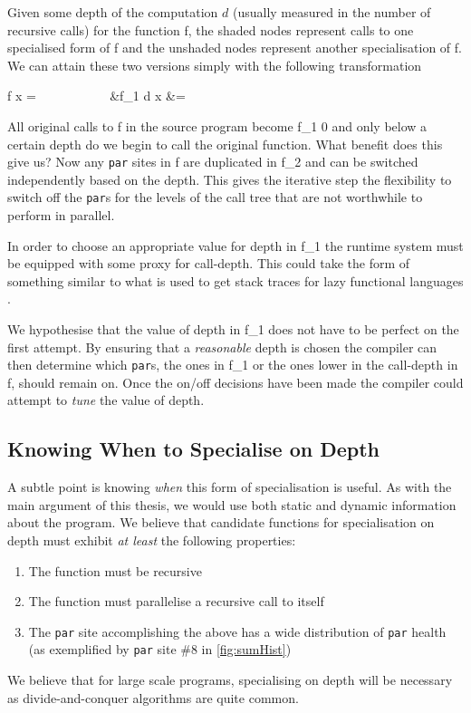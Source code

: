 Given some depth of the computation $d$ (usually measured in the number of
recursive calls) for the function \<f\>, the shaded nodes represent calls to one
specialised form of \<f\> and the unshaded nodes represent another specialisation
of \<f\>. We can attain these two versions simply with the following transformation

\begin{haskell}
f x =  \(\phantom{space}\) \Longrightarrow
\(\phantom{space}\) &f_{1} d x &=  \\
\end{haskell}

All original calls to \<f\> in the source program become \<f_{1} 0\> and only
below a certain depth do we begin to call the original function. What benefit does
this give us? Now any \verb|par| sites in \<f\> are duplicated in \<f_{2}\>
and can be switched independently based on the depth. This gives the iterative
step the flexibility to switch off the \verb|par|s for the levels of the call
tree that are not worthwhile to perform in parallel.

In order to choose an appropriate value for \<depth\> in \<f_{1}\> the runtime
system must be equipped with some proxy for call-depth. This could take the form
of something similar to what is used to get stack traces for lazy functional languages
\citep{AllwoodStack}.

We hypothesise that the value of \<depth\> in \<f_{1}\> does not have to be
perfect on the first attempt. By ensuring that a \emph{reasonable} \<depth\> is
chosen the compiler can then determine which \verb|par|s, the ones in \<f_{1}\>
or the ones lower in the call-depth in \<f\>, should remain on. Once the on/off
decisions have been made the compiler could attempt to \emph{tune} the value of
\<depth\>.

\subsection{Knowing When to Specialise on Depth}

A subtle point is knowing \emph{when} this form of specialisation is useful.
As with the main argument of this thesis, we would use both static and dynamic
information about the program.  We believe that candidate functions for
specialisation on depth must exhibit \emph{at least} the following properties:

\begin{enumerate}
    \item The function must be recursive
    \item The function must parallelise a recursive call to itself
    \item The \verb|par| site accomplishing the above has a wide distribution
            of \verb|par| health (as exemplified by \verb|par| site \#8 in
            \ref{fig:sumHist})
\end{enumerate}

We believe that for large scale programs, specialising on depth will be
necessary as divide-and-conquer algorithms are quite common.
